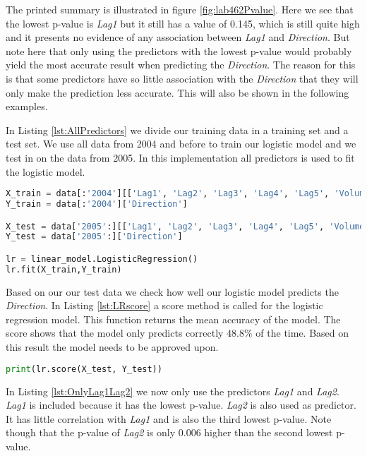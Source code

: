 The printed summary is illustrated in figure \ref{fig:lab462Pvalue}. Here we see that the lowest p-value is \emph{Lag1} but it still has a value of 0.145, which is still quite high and it presents no evidence of any association between \emph{Lag1} and \emph{Direction}. But note here that only using the predictors with the lowest p-value would probably yield the most accurate result when predicting the \emph{Direction}. The reason for this is that some predictors have so little association with the \emph{Direction} that they will only make the prediction less accurate. This will also be shown in the following examples.


In Listing \ref{lst:AllPredictors} we divide our training data in a training set and a test set. We use all data from 2004 and before to train our logistic model and we test in on the data from 2005.  In this implementation all predictors is used to fit the logistic model.

\begin{lstlisting}[language=Python, label=lst:AllPredictors, caption=Logistic regression using all predictors]
X_train = data[:'2004'][['Lag1', 'Lag2', 'Lag3', 'Lag4', 'Lag5', 'Volume']]
Y_train = data[:'2004']['Direction']

X_test = data['2005':][['Lag1', 'Lag2', 'Lag3', 'Lag4', 'Lag5', 'Volume']]
Y_test = data['2005':]['Direction']

lr = linear_model.LogisticRegression()
lr.fit(X_train,Y_train)
\end{lstlisting}

Based on our our test data we check how well our logistic model predicts the \emph{Direction}. In Listing \ref{lst:LRscore} a score method is called for the logistic regression model. This function returns the mean accuracy of the model. The score shows that the model only predicts correctly $48.8\%$ of the time. Based on this result the model needs to be approved upon.
\begin{lstlisting}[language=Python, label=lst:LRscore, caption=Logistic regression using all predictors]
print(lr.score(X_test, Y_test))
\end{lstlisting}

In Listing \ref{lst:OnlyLag1Lag2} we now only use the predictors \emph{Lag1} and \emph{Lag2}. \emph{Lag1} is included because it has the lowest p-value. \emph{Lag2} is also used as predictor. It has little correlation with \emph{Lag1} and is also the third lowest p-value. Note though that the p-value of \emph{Lag2} is only 0.006 higher than the second lowest p-value.

